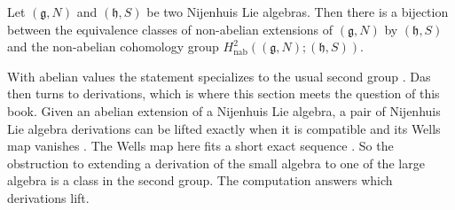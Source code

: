 \begin{theorem}\label{thm:cohomology:nijenhuis-nonabelian}
Let $(\mathfrak{g},N)$ and $(\mathfrak{h},S)$ be two Nijenhuis Lie algebras.
Then there is a bijection between the equivalence classes of non-abelian
extensions of $(\mathfrak{g},N)$ by $(\mathfrak{h},S)$ and the non-abelian
cohomology group $H^{2}_{\mathrm{nab}}((\mathfrak{g},N);(\mathfrak{h},S))$.
\end{theorem}

With abelian values the statement specializes to the usual second group
\cite[Theorem~3.7, p.~7]{Das2025Nijenhuis}. Das then turns to derivations,
which is where this section meets the question of this book. Given an abelian
extension of a Nijenhuis Lie algebra, a pair of Nijenhuis
Lie algebra derivations can be lifted exactly when it is compatible and its
Wells map vanishes \cite[Theorem~5.4, p.~19]{Das2025Nijenhuis}. The Wells map
here fits a short exact sequence \cite[Theorem~5.5, p.~20]{Das2025Nijenhuis}.
So the obstruction to extending a derivation of the small algebra to one of
the large algebra is a class in the second group. The computation answers
which derivations lift.

